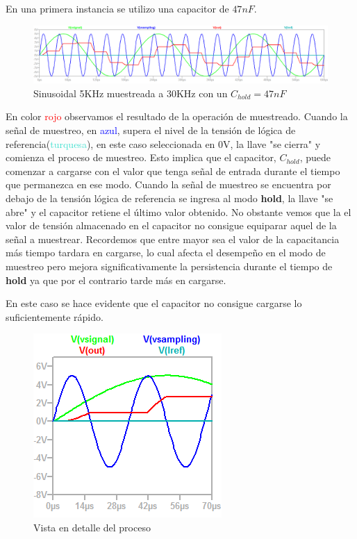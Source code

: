 En una primera instancia se utilizo una capacitor de $47nF$. 
\begin{figure}[H]
	\centering
	\includegraphics[width=\linewidth]{ImagenesEjercicio4/ChTests/Vin1_30ksamplig47nF}
	\caption{Sinusoidal 5KHz muestreada a 30KHz con un $C_{hold}=47nF$}
	\label{fig:vin130ksamplig47nf}
\end{figure}
En color \textcolor{red}{rojo} observamos el resultado de la operación de muestreado. 
Cuando la señal de muestreo, en \textcolor{blue}{azul}, supera el nivel de la tensión de lógica de referencia(\textcolor{turquoise}{turquesa}), en este caso seleccionada en 0V, la llave "se cierra" y comienza el proceso de muestreo. Esto implica que el capacitor, $C_{hold}$, puede comenzar a cargarse con el valor que tenga señal de entrada durante el tiempo que permanezca en ese modo. Cuando la señal de muestreo se encuentra por debajo de la tensión lógica de referencia se ingresa al modo \textbf{hold}, la llave "se abre" y el capacitor retiene el último valor obtenido. No obstante vemos que la el valor de tensión almacenado en el capacitor no consigue equiparar aquel de la señal a muestrear. Recordemos que entre mayor sea el valor de la capacitancia más tiempo tardara en cargarse, lo cual afecta el desempeño en el modo de muestreo pero mejora significativamente la persistencia durante el tiempo de \textbf{hold} ya que por el contrario tarde más en cargarse.

En este caso se hace evidente que el capacitor no consigue cargarse lo suficientemente rápido.

\begin{figure}[H]
	\centering
	\includegraphics[]{ImagenesEjercicio4/ChTests/Vin1_30ksamplig47nFZoom}
	\caption{Vista en detalle del proceso}
	\label{fig:vin130ksamplig47nfzoom}
\end{figure}

